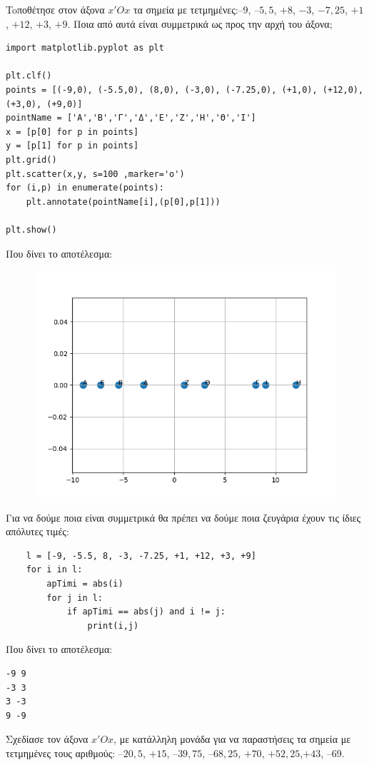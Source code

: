 \begin{exercise}
Toποθέτησε στον άξονα $x'Οx$ τα σημεία με τετμημένες:$–9$, $–5,5$, $+8$, $-3$, $-7,25$, $+1$, $+12$, $+3$, $+9$. 
Ποια από αυτά είναι συμμετρικά ως προς την αρχή του άξονα;
\end{exercise}
\begin{lstlisting}
import matplotlib.pyplot as plt

plt.clf()
points = [(-9,0), (-5.5,0), (8,0), (-3,0), (-7.25,0), (+1,0), (+12,0), (+3,0), (+9,0)]
pointName = ['Α','Β','Γ','Δ','Ε','Ζ','Η','Θ','Ι']
x = [p[0] for p in points]
y = [p[1] for p in points]
plt.grid()
plt.scatter(x,y, s=100 ,marker='o')
for (i,p) in enumerate(points):
    plt.annotate(pointName[i],(p[0],p[1]))

plt.show()
\end{lstlisting}
Που δίνει το αποτέλεσμα:
\begin{figure}[h]
\includegraphics{graph10.png}
\end{figure}
Για να δούμε ποια είναι συμμετρικά θα πρέπει να δούμε ποια ζευγάρια έχουν τις ίδιες απόλυτες τιμές:
\begin{lstlisting}
    l = [-9, -5.5, 8, -3, -7.25, +1, +12, +3, +9]
    for i in l:
        apTimi = abs(i)
        for j in l:
            if apTimi == abs(j) and i != j:
                print(i,j)
\end{lstlisting}
Που δίνει το αποτέλεσμα:
\begin{lstlisting}
-9 9
-3 3
3 -3
9 -9
\end{lstlisting}
\begin{exercise}
Σχεδίασε τον άξονα $x'Ox$, με κατάλληλη μονάδα για να παραστήσεις τα σημεία με
τετμημένες τους αριθμούς: $–20,5$, $+15$, $–39,75$, $–68,25$, $+70$, $+52,25$,$+43$, $–69$.
\end{exercise}
